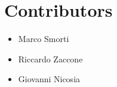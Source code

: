 \chapter*{Contributors}

\begin{itemize}
	\item Marco Smorti
	\item Riccardo Zaccone
	\item Giovanni Nicosia
\end{itemize}
